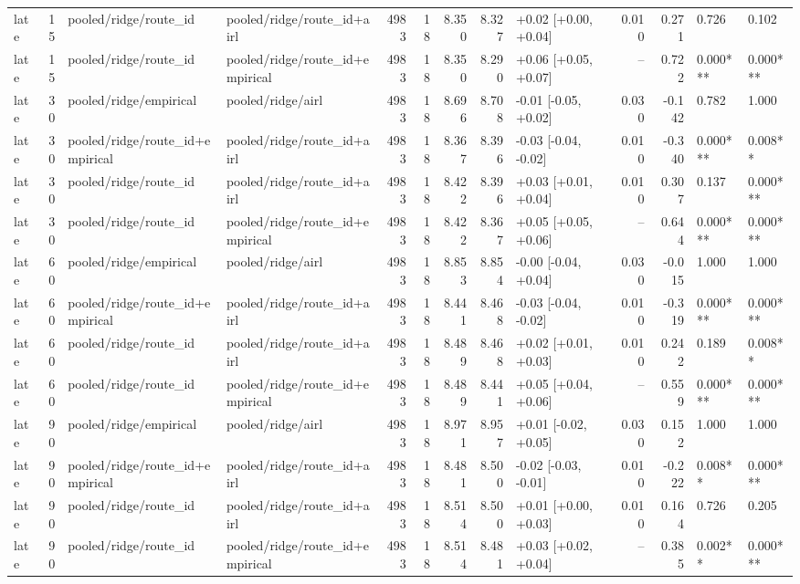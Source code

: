 \begin{tabular}{lrllrrrrlrrll}
late & 15 & pooled/ridge/route_id & pooled/ridge/route_id+airl & 4983 & 18 & 8.350 & 8.327 & +0.02 [+0.00, +0.04] & 0.010 & 0.271 & 0.726 & 0.102 \\
late & 15 & pooled/ridge/route_id & pooled/ridge/route_id+empirical & 4983 & 18 & 8.350 & 8.290 & +0.06 [+0.05, +0.07] & -- & 0.722 & 0.000*** & 0.000*** \\
late & 30 & pooled/ridge/empirical & pooled/ridge/airl & 4983 & 18 & 8.696 & 8.708 & -0.01 [-0.05, +0.02] & 0.030 & -0.142 & 0.782 & 1.000 \\
late & 30 & pooled/ridge/route_id+empirical & pooled/ridge/route_id+airl & 4983 & 18 & 8.367 & 8.396 & -0.03 [-0.04, -0.02] & 0.010 & -0.340 & 0.000*** & 0.008** \\
late & 30 & pooled/ridge/route_id & pooled/ridge/route_id+airl & 4983 & 18 & 8.422 & 8.396 & +0.03 [+0.01, +0.04] & 0.010 & 0.307 & 0.137 & 0.000*** \\
late & 30 & pooled/ridge/route_id & pooled/ridge/route_id+empirical & 4983 & 18 & 8.422 & 8.367 & +0.05 [+0.05, +0.06] & -- & 0.644 & 0.000*** & 0.000*** \\
late & 60 & pooled/ridge/empirical & pooled/ridge/airl & 4983 & 18 & 8.853 & 8.854 & -0.00 [-0.04, +0.04] & 0.030 & -0.015 & 1.000 & 1.000 \\
late & 60 & pooled/ridge/route_id+empirical & pooled/ridge/route_id+airl & 4983 & 18 & 8.441 & 8.468 & -0.03 [-0.04, -0.02] & 0.010 & -0.319 & 0.000*** & 0.000*** \\
late & 60 & pooled/ridge/route_id & pooled/ridge/route_id+airl & 4983 & 18 & 8.489 & 8.468 & +0.02 [+0.01, +0.03] & 0.010 & 0.242 & 0.189 & 0.008** \\
late & 60 & pooled/ridge/route_id & pooled/ridge/route_id+empirical & 4983 & 18 & 8.489 & 8.441 & +0.05 [+0.04, +0.06] & -- & 0.559 & 0.000*** & 0.000*** \\
late & 90 & pooled/ridge/empirical & pooled/ridge/airl & 4983 & 18 & 8.971 & 8.957 & +0.01 [-0.02, +0.05] & 0.030 & 0.152 & 1.000 & 1.000 \\
late & 90 & pooled/ridge/route_id+empirical & pooled/ridge/route_id+airl & 4983 & 18 & 8.481 & 8.500 & -0.02 [-0.03, -0.01] & 0.010 & -0.222 & 0.008** & 0.000*** \\
late & 90 & pooled/ridge/route_id & pooled/ridge/route_id+airl & 4983 & 18 & 8.514 & 8.500 & +0.01 [+0.00, +0.03] & 0.010 & 0.164 & 0.726 & 0.205 \\
late & 90 & pooled/ridge/route_id & pooled/ridge/route_id+empirical & 4983 & 18 & 8.514 & 8.481 & +0.03 [+0.02, +0.04] & -- & 0.385 & 0.002** & 0.000*** \\

\end{tabular}
